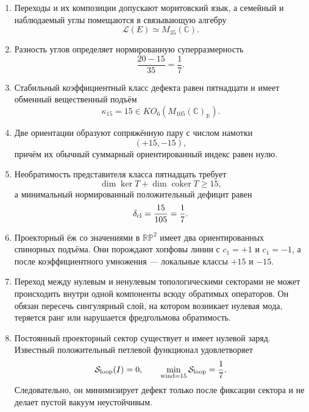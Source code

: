 \begin{enumerate}
 \item Переходы и их композиции допускают моритовский язык, а семейный и
 наблюдаемый углы помещаются в связывающую алгебру
 \begin{equation}
  \mathcal L(E)\simeq M_{35}(\mathbb C).
 \end{equation}

 \item Разность углов определяет нормированную суперразмерность
 \begin{equation}
  \frac{20-15}{35}=\frac17.
 \end{equation}

 \item Стабильный коэффициентный класс дефекта равен пятнадцати и имеет
 обменный вещественный подъём
 \begin{equation}
  \kappa_{15}=15\in KO_6(M_{105}(\mathbb C)_{\mathbb R}).
 \end{equation}

 \item Две ориентации образуют сопряжённую пару с числом намотки
 \begin{equation}
  (+15,-15),
 \end{equation}
 причём их обычный суммарный ориентированный индекс равен нулю.

 \item Необратимость представителя класса пятнадцать требует
 \begin{equation}
  \dim\ker T+\dim\operatorname{coker}T\geq15,
 \end{equation}
 а минимальный нормированный положительный дефицит равен
 \begin{equation}
  \delta_{\rm cl}=\frac{15}{105}=\frac17.
 \end{equation}

 \item Проекторный ёж со значениями в $\mathbb{RP}^2$ имеет два
 ориентированных спинорных подъёма. Они порождают хопфовы линии с
 $c_1=+1$ и $c_1=-1$, а после коэффициентного умножения --- локальные
 классы $+15$ и $-15$.

 \item Переход между нулевым и ненулевым топологическими секторами не
 может происходить внутри одной компоненты всюду обратимых операторов.
 Он обязан пересечь сингулярный слой, на котором возникает нулевая мода,
 теряется ранг или нарушается фредгольмова обратимость.

 \item Постоянный проекторный сектор существует и имеет нулевой заряд.
 Известный положительный петлевой функционал удовлетворяет
 \begin{equation}
  \mathcal S_{\rm loop}(I)=0,
  \qquad
  \min_{\operatorname{wind}=15}\mathcal S_{\rm loop}=\frac17.
 \end{equation}
 Следовательно, он минимизирует дефект только после фиксации сектора и не
 делает пустой вакуум неустойчивым.
\end{enumerate}

